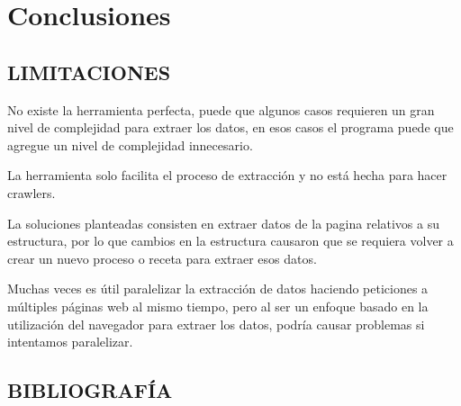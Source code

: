 \documentclass[12pt]{report}
\begin{document}

\chapter{Conclusiones}

\section[Limitaciones]{LIMITACIONES}

No existe la herramienta perfecta, puede que algunos casos requieren un gran nivel de complejidad para extraer los datos, en esos casos el programa puede que agregue un nivel de complejidad innecesario.

La herramienta solo facilita el proceso de extracción y no está hecha para hacer crawlers.

La soluciones planteadas consisten en extraer datos de la pagina relativos a su estructura, por lo que cambios en la estructura causaron que se requiera volver a crear un nuevo proceso o receta para extraer esos datos.

Muchas veces es útil paralelizar la extracción de datos haciendo peticiones a múltiples páginas web al mismo tiempo, pero al ser un enfoque basado en la utilización del navegador para extraer los datos, podría causar problemas si intentamos paralelizar.

\break

\section[Bibliografía]{BIBLIOGRAFÍA}

\nocite{*}



\break
\end{document}
